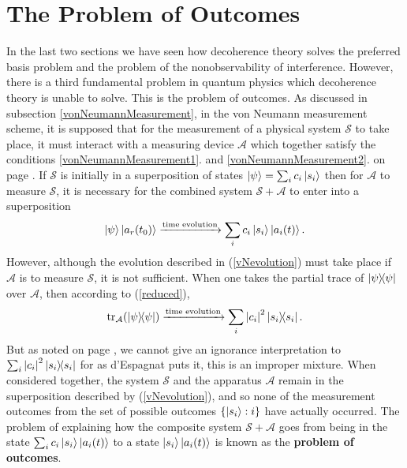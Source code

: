   
    \section{The Problem of Outcomes}\label{probOutcomes}
    In the last two sections we have seen how decoherence theory solves the preferred basis problem and the problem of the nonobservability of interference. However, there is a third fundamental problem in quantum physics which decoherence theory is unable to solve. This is the problem of outcomes. As discussed in subsection \ref{vonNeumannMeasurement}, in the von Neumann measurement scheme, it is supposed that for the measurement of a physical system $\mathcal{S}$ to take place, it must interact with a measuring device $\mathcal{A}$ which together satisfy the conditions \ref{vonNeumannMeasurement1}. and \ref{vonNeumannMeasurement2}. on page \pageref{vonNeumannMeasurement1}. If $\mathcal{S}$ is initially in a superposition of states $\ket{\psi}=\sum_i c_i\ket{s_i}$ then for $\mathcal{A}$ to measure $\mathcal{S}$, it is necessary for the combined system $\mathcal{S}+\mathcal{A}$ to enter into a superposition
    \begin{equation}\label{vNevolution}
    \ket{\psi}\ket{a_r(t_0)}\xrightarrow{\text{time evolution}}\sum_i c_i\ket{s_i}\ket{a_i(t)}.
    \end{equation}
    However, although the evolution described in (\ref{vNevolution}) must take place if $\mathcal{A}$ is to measure $\mathcal{S}$, it is not sufficient. When one takes the partial trace of $\dyad{\psi}$ over $\mathcal{A}$, then according to (\ref{reduced}),
    \begin{equation}\label{vNevolution2}
    \tr_\mathcal{A}(\dyad{\psi})\xrightarrow{\text{time evolution}}\sum_i \abs{c_i}^2\dyad{s_i}.
    \end{equation}
    But as noted on page \pageref{Espagnat}, we cannot give an ignorance interpretation to $\sum_i \abs{c_i}^2\dyad{s_i}$ for as d'Espagnat puts it, this is an improper mixture. When considered together, the system $\mathcal{S}$ and the apparatus $\mathcal{A}$ remain in the superposition described by (\ref{vNevolution}), and so none of the measurement outcomes from the set of possible outcomes $\{\ket{s_i}:i\}$ have actually occurred. The problem of explaining how the composite system   $\mathcal{S}+\mathcal{A}$       goes from being in the state $\sum_i c_i\ket{s_i}\ket{a_i(t)}$ to a state $\ket{s_i}\ket{a_i(t)}$ is known as the \textbf{problem of outcomes}.\label{proboutcomes}  